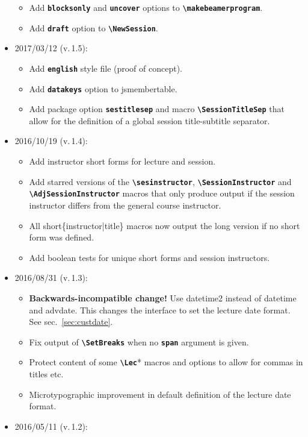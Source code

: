 \documentclass[english]{article}
\newcommand*\jmacro[1]{\textbf{\texttt{#1}}}
\newcommand*\jcsmacro[1]{\jmacro{\textbackslash{#1}}}
\newcommand*\joption[1]{\textbf{\texttt{#1}}}
\newcommand*\jsmt{\textsf{jsmembertable}}
\begin{document}
\begin{itemize}
\begin{itemize}
	    \item Add \joption{blocksonly} and \joption{uncover} options to \jcsmacro{makebeamerprogram}.
	    \item Add \joption{draft} option to \jcsmacro{NewSession}.
    \end{itemize}
\item 2017/03/12 (v.\,1.5):
	\begin{itemize}
		\item Add \joption{english} style file (proof of concept).
		\item Add \joption{datakeys} option to \jsmt.
		\item Add package option \joption{sestitlesep} and macro \jcsmacro{SessionTitleSep} that
		allow for the definition of a global session title-subtitle	separator.
	\end{itemize}
\item 2016/10/19 (v.\,1.4):
	\begin{itemize}
		\item Add instructor short forms for lecture and session.
		\item Add starred versions of the \jcsmacro{sesinstructor}, \jcsmacro{SessionInstructor} and \jcsmacro{AdjSessionInstructor} macros that only produce output if the session instructor differs from the general course instructor.
		\item All short\{instructor|title\} macros now output the long version if no short form was defined.
		\item Add boolean tests for unique short forms and session instructors.
	\end{itemize}
\item 2016/08/31 (v.\,1.3):
     \begin{itemize}
     	\item \textbf{Backwards-incompatible change!} Use \textsf{datetime2} instead of \textsf{datetime} and \textsf{advdate}.
     	      This changes the interface to set the lecture date format. See sec.~\ref{sec:custdate}.
     	\item Fix output of \jcsmacro{SetBreaks} when no \joption{span} argument is given.
     	\item Protect content of some \jcsmacro{Lec}* macros and options to allow for commas in
     	      titles etc.
        \item Microtypographic improvement in default definition of the lecture date format.
	 \end{itemize}
\item 2016/05/11 (v.\,1.2):

\end{itemize}
\end{document}
